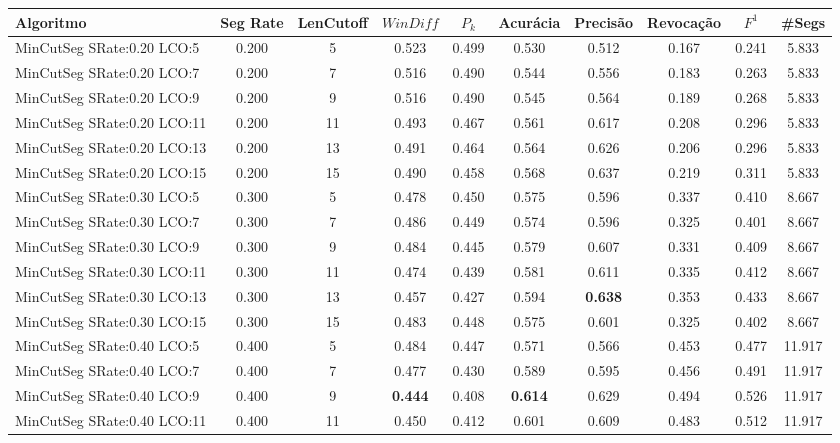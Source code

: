 \documentclass{article}
\begin{document}
\newpage
\begin{longtable}[c]{|l|c|c|c|c|c|c|c|c|c|} 
\hline 
Algoritmo & Seg Rate & LenCutoff & $WinDiff$ & $P_k$ & Acurácia & Precisão & Revocação & $F^1$ & \#Segs\\ \hline 
MinCutSeg SRate:0.20 LCO:5 & 0.200 & 5 & 0.523 & 0.499 & 0.530 & 0.512 & 0.167 & 0.241 & 5.833  \\ \hline 
 MinCutSeg SRate:0.20 LCO:7 & 0.200 & 7 & 0.516 & 0.490 & 0.544 & 0.556 & 0.183 & 0.263 & 5.833  \\ \hline 
 MinCutSeg SRate:0.20 LCO:9 & 0.200 & 9 & 0.516 & 0.490 & 0.545 & 0.564 & 0.189 & 0.268 & 5.833  \\ \hline 
 MinCutSeg SRate:0.20 LCO:11 & 0.200 & 11 & 0.493 & 0.467 & 0.561 & 0.617 & 0.208 & 0.296 & 5.833  \\ \hline 
 MinCutSeg SRate:0.20 LCO:13 & 0.200 & 13 & 0.491 & 0.464 & 0.564 & 0.626 & 0.206 & 0.296 & 5.833  \\ \hline 
 MinCutSeg SRate:0.20 LCO:15 & 0.200 & 15 & 0.490 & 0.458 & 0.568 & 0.637 & 0.219 & 0.311 & 5.833  \\ \hline 
 MinCutSeg SRate:0.30 LCO:5 & 0.300 & 5 & 0.478 & 0.450 & 0.575 & 0.596 & 0.337 & 0.410 & 8.667  \\ \hline 
 MinCutSeg SRate:0.30 LCO:7 & 0.300 & 7 & 0.486 & 0.449 & 0.574 & 0.596 & 0.325 & 0.401 & 8.667  \\ \hline 
 MinCutSeg SRate:0.30 LCO:9 & 0.300 & 9 & 0.484 & 0.445 & 0.579 & 0.607 & 0.331 & 0.409 & 8.667  \\ \hline 
 MinCutSeg SRate:0.30 LCO:11 & 0.300 & 11 & 0.474 & 0.439 & 0.581 & 0.611 & 0.335 & 0.412 & 8.667  \\ \hline 
 MinCutSeg SRate:0.30 LCO:13 & 0.300 & 13 & 0.457 & 0.427 & 0.594 & \cellcolor{gray!20} \textbf{0.638} & 0.353 & 0.433 & 8.667  \\ \hline 
 MinCutSeg SRate:0.30 LCO:15 & 0.300 & 15 & 0.483 & 0.448 & 0.575 & 0.601 & 0.325 & 0.402 & 8.667  \\ \hline 
 MinCutSeg SRate:0.40 LCO:5 & 0.400 & 5 & 0.484 & 0.447 & 0.571 & 0.566 & 0.453 & 0.477 & 11.917  \\ \hline 
 MinCutSeg SRate:0.40 LCO:7 & 0.400 & 7 & 0.477 & 0.430 & 0.589 & 0.595 & 0.456 & 0.491 & 11.917  \\ \hline 
 MinCutSeg SRate:0.40 LCO:9 & 0.400 & 9 & \cellcolor{gray!20} \textbf{0.444} & 0.408 & \cellcolor{gray!20} \textbf{0.614} & 0.629 & 0.494 & 0.526 & 11.917  \\ \hline 
 MinCutSeg SRate:0.40 LCO:11 & 0.400 & 11 & 0.450 & 0.412 & 0.601 & 0.609 & 0.483 & 0.512 & 11.917  \\ \hline 

\end{longtable}
\end{document}
